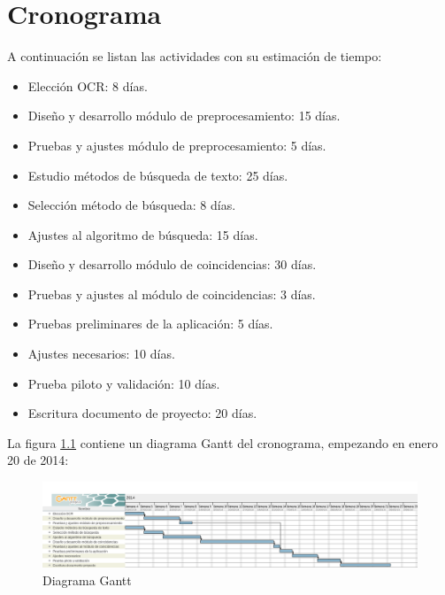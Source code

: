 \chapter{Cronograma}
\label{sec:cronograma}
A continuaci\'on se listan las actividades con su estimaci\'on de tiempo:
\begin{itemize}
\item Elecci\'on OCR: 8 d\'ias.
\item Dise\~no y desarrollo m\'odulo de preprocesamiento: 15 d\'ias.
\item Pruebas y ajustes m\'odulo de preprocesamiento: 5 d\'ias.
\item Estudio m\'etodos de b\'usqueda de texto: 25 d\'ias.
\item Selecci\'on m\'etodo de b\'usqueda: 8 d\'ias.
\item Ajustes al algoritmo de b\'usqueda: 15 d\'ias.
\item Dise\~no y desarrollo m\'odulo de coincidencias: 30 d\'ias.
\item Pruebas y ajustes al m\'odulo de coincidencias: 3 d\'ias.
\item Pruebas preliminares de la aplicaci\'on: 5 d\'ias.
\item Ajustes necesarios: 10 d\'ias.
\item Prueba piloto y validaci\'on: 10 d\'ias.
\item Escritura documento de proyecto: 20 d\'ias.

\end{itemize}
La figura \ref{fig:dgantt} contiene un diagrama Gantt del cronograma, empezando en enero 20 de 2014:
\begin{figure}[h]
\begin{center}
\includegraphics[scale=0.3]{./CronogramaProyectoGrado.png}
\end{center}
{\caption{Diagrama Gantt}\label{fig:dgantt}}
\end{figure}

\pagebreak